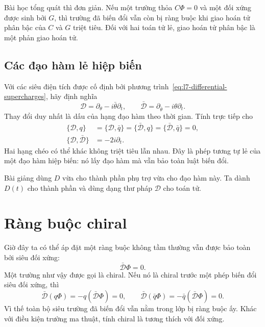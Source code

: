 Bài học tổng quát thì đơn giản. Nếu một trường thỏa \(C\Phi=0\) và một đối xứng được sinh bởi \(G\), thì trường đã biến đổi vẫn còn bị ràng buộc khi giao hoán tử phân bậc của \(C\) và \(G\) triệt tiêu. Đối với hai toán tử lẻ, giao hoán tử phân bậc là một phản giao hoán tử.

\begin{classroomqa}
\end{classroomqa}

\subsection{Các đạo hàm lẻ hiệp biến}

Với các siêu điện tích được cố định bởi phương trình~\eqref{eq:l7-differential-supercharges}, hãy định nghĩa
\begin{equation}
\mathcal D=\partial_\theta-i\bar\theta\partial_t,
\qquad
\bar{\mathcal D}=\partial_{\bar\theta}-i\theta\partial_t.
\label{eq:l7-covariant-derivatives}
\end{equation}
Thay đổi duy nhất là dấu của hạng đạo hàm theo thời gian. Tính trực tiếp cho
\begin{align}
\{\mathcal D,q\}
&=\{\mathcal D,\bar q\}
=\{\bar{\mathcal D},q\}
=\{\bar{\mathcal D},\bar q\}=0,\\
\{\mathcal D,\bar{\mathcal D}\}&=-2i\partial_t.
\label{eq:l7-covariant-algebra}
\end{align}
Hai hạng chéo có thể khác không triệt tiêu lẫn nhau. Đây là phép tương tự lẻ của một đạo hàm hiệp biến: nó lấy đạo hàm mà vẫn bảo toàn luật biến đổi.

Bài giảng dùng \(D\) vừa cho thành phần phụ trợ vừa cho đạo hàm này. Ta dành \(D(t)\) cho thành phần và dùng dạng thư pháp \(\mathcal D\) cho toán tử.

\section{Ràng buộc chiral}

Giờ đây ta có thể áp đặt một ràng buộc không tầm thường vẫn được bảo toàn bởi siêu đối xứng:
\begin{equation}
\bar{\mathcal D}\Phi=0.
\label{eq:l7-chiral-constraint}
\end{equation}
Một trường như vậy được gọi là chiral. Nếu nó là chiral trước một phép biến đổi siêu đối xứng, thì
\begin{equation}
\bar{\mathcal D}(q\Phi)
=-q(\bar{\mathcal D}\Phi)=0,
\qquad
\bar{\mathcal D}(\bar q\Phi)
=-\bar q(\bar{\mathcal D}\Phi)=0.
\end{equation}
Vì thế toàn bộ siêu trường đã biến đổi vẫn nằm trong lớp bị ràng buộc ấy. Khác với điều kiện trường ma thuật, tính chiral là tương thích với đối xứng.

